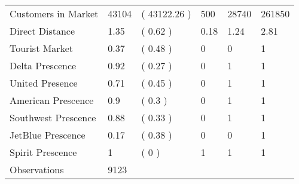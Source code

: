 \begin{tabular}[t]{llllll}
\hspace{1em}Customers in Market & 43104 & ( 43122.26 ) & 500 & 28740 & 261850\\
\hspace{1em}Direct Distance & 1.35 & ( 0.62 ) & 0.18 & 1.24 & 2.81\\
\hspace{1em}Tourist Market & 0.37 & ( 0.48 ) & 0 & 0 & 1\\
\hspace{1em}Delta Prescence & 0.92 & ( 0.27 ) & 0 & 1 & 1\\
\hspace{1em}United Presence & 0.71 & ( 0.45 ) & 0 & 1 & 1\\
\hspace{1em}American Prescence & 0.9 & ( 0.3 ) & 0 & 1 & 1\\
\hspace{1em}Southwest Prescence & 0.88 & ( 0.33 ) & 0 & 1 & 1\\
\hspace{1em}JetBlue Prescence & 0.17 & ( 0.38 ) & 0 & 0 & 1\\
\hspace{1em}Spirit Prescence & 1 & ( 0 ) & 1 & 1 & 1\\
\midrule
\hspace{1em}Observations & 9123 &  &  &  & \\
\bottomrule
\end{tabular}
